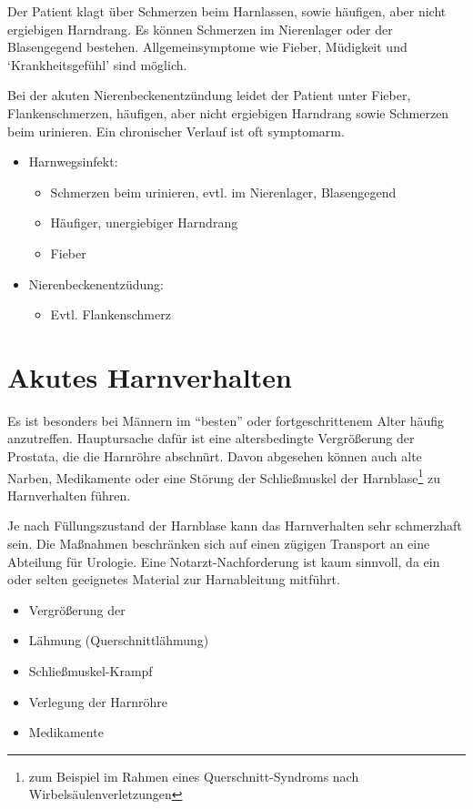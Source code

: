 {Der Patient klagt über Schmerzen beim Harnlassen, sowie
häufigen, aber nicht ergiebigen Harndrang. Es können
Schmerzen im Nierenlager oder der Blasengegend bestehen.
Allgemeinsymptome wie Fieber, Müdigkeit und
\enquote*{Krankheitsgefühl} sind möglich. 

Bei der akuten
Nierenbeckenentzündung leidet der Patient unter Fieber,
Flankenschmerzen, häufigen, aber nicht ergiebigen Harndrang
sowie Schmerzen beim urinieren. Ein chronischer Verlauf ist 
oft symptomarm.
}
{
\begin{itemize}
  \item Harnwegsinfekt:
  \begin{itemize}
    \item Schmerzen beim urinieren, evtl. im Nierenlager,
    Blasengegend
    \item Häufiger, unergiebiger Harndrang
    \item Fieber
  \end{itemize}
  \item Nierenbeckenentzüdung:
  \begin{itemize}
    \item Evtl. Flankenschmerz
  \end{itemize}
\end{itemize}
}
{}
{}
{}


\section{Akutes Harnverhalten}
\label{topic:harnverhalten}%

{%
Es ist besonders bei Männern im
\enquote{besten} oder fortgeschrittenem Alter häufig
anzutreffen. Hauptursache  dafür ist eine altersbedingte
Vergrößerung der
Prostata, die die Harnröhre abschnürt. Davon abgesehen
können auch alte Narben, Medikamente oder eine Störung der
Schließmuskel der Harnblase\footnote{zum Beispiel im Rahmen
eines Querschnitt-Syndroms nach Wirbelsäulenverletzungen} zu
Harnverhalten führen.

Je nach Füllungszustand der Harnblase kann das
Harnverhalten sehr schmerzhaft sein.
Die Maßnahmen beschränken sich auf einen zügigen Transport
an eine Abteilung für Urologie. Eine Notarzt-Nachforderung
ist kaum sinnvoll, da ein  oder  selten geeignetes
Material zur Harnableitung mitführt. 
}
{
\begin{itemize}
  \item Vergrößerung der 
  \item Lähmung (Querschnittlähmung)
  \item Schließmuskel-Krampf
  \item Verlegung der Harnröhre
  \item Medikamente
\end{itemize}
}{}{}{}

